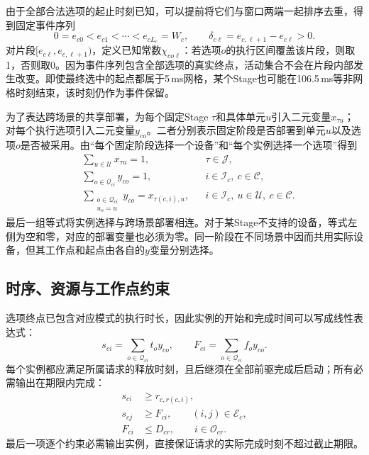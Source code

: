 由于全部合法选项的起止时刻已知，可以提前将它们与窗口两端一起排序去重，得到固定事件序列
\begin{equation}
 0=e_{c0}<e_{c1}<\cdots<e_{cL_c}=W_c,\qquad
 \delta_{c\ell}=e_{c,\ell+1}-e_{c\ell}>0.
 \label{eq:c3-events}
\end{equation}
对片段$[e_{c\ell},e_{c,\ell+1})$，定义已知常数$\chi_{co\ell}$：若选项$o$的执行区间覆盖该片段，则取1，否则取0。因为事件序列包含全部选项的真实终点，活动集合不会在片段内部发生改变。即使最终选中的起点都属于5\,ms网格，某个Stage也可能在106.5\,ms等非网格时刻结束，该时刻仍作为事件保留。

为了表达跨场景的共享部署，为每个固定Stage $\tau$和具体单元$u$引入二元变量$x_{\tau u}$；对每个执行选项引入二元变量$y_{co}$。二者分别表示固定阶段是否部署到单元$u$以及选项$o$是否被采用。由“每个固定阶段选择一个设备”和“每个实例选择一个选项”得到
\begin{equation}
 \begin{aligned}
 &\sum_{u\in\mathcal U}x_{\tau u}=1,
 &&\tau\in\mathcal J,\\
 &\sum_{o\in\mathcal Q_{ci}}y_{co}=1,
 &&i\in\mathcal I_c,\ c\in\mathcal C,\\
 &\sum_{\substack{o\in\mathcal Q_{ci}\\u_o=u}}y_{co}
       =x_{\tau(c,i),u},
 &&i\in\mathcal I_c,\ u\in\mathcal U,\ c\in\mathcal C.
 \end{aligned}
 \label{eq:c3-link}
\end{equation}
最后一组等式将实例选择与跨场景部署相连。对于某Stage不支持的设备，等式左侧为空和零，对应的部署变量也必须为零。同一阶段在不同场景中因而共用实际设备，但其工作点和起点由各自的$y$变量分别选择。

\subsection{时序、资源与工作点约束}

选项终点已包含对应模式的执行时长，因此实例的开始和完成时间可以写成线性表达式：
\begin{equation}
 s_{ci}=\sum_{o\in\mathcal Q_{ci}}t_o y_{co},\qquad
 F_{ci}=\sum_{o\in\mathcal Q_{ci}}f_o y_{co}.
 \label{eq:c3-option-time}
\end{equation}
每个实例都应满足所属请求的释放时刻，且后继须在全部前驱完成后启动；所有必需输出在期限内完成：
\begin{equation}
 \begin{aligned}
 s_{ci}&\ge r_{c,r(c,i)},\\
 s_{cj}&\ge F_{ci},\qquad(i,j)\in\mathcal E_c,\\
 F_{ci}&\le D_{cr},\qquad i\in\mathcal O_{cr}.
 \end{aligned}
 \label{eq:c3-schedule-constraints}
\end{equation}
最后一项逐个约束必需输出实例，直接保证请求的实际完成时刻不超过截止期限。

